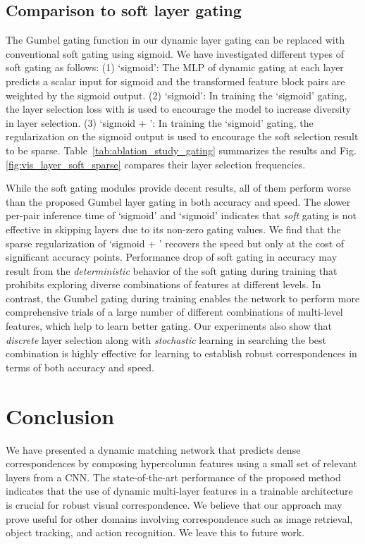 \documentclass[runningheads]{llncs}
\begin{document}
\subsection{Comparison to soft layer gating} \label{sec:softgating}
The Gumbel gating function in our dynamic layer gating can be replaced with conventional soft gating using sigmoid.  
We have investigated different types of soft gating as follows:   
(1) `sigmoid': The MLP of dynamic gating at each layer predicts a scalar input for sigmoid and the transformed feature block pairs are weighted by the sigmoid output.
(2) `sigmoid': In training the `sigmoid' gating, the layer selection loss  with  is used to encourage the model to increase diversity in layer selection.
(3) `sigmoid + ': In training the `sigmoid' gating, the  regularization on the sigmoid output is used to encourage the soft selection result to be sparse. 
Table~\ref{tab:ablation_study_gating} summarizes the results and Fig. \ref{fig:vis_layer_soft_sparse} compares their layer selection frequencies.  

While the soft gating modules provide decent results, all of them perform worse than the proposed Gumbel layer gating in both accuracy and speed. 
The slower per-pair inference time of `sigmoid' and `sigmoid' indicates that {\em soft} gating is not effective in skipping layers due to its non-zero gating values. We find that the sparse regularization of `sigmoid + ' recovers the speed but only at the cost of significant accuracy points.  
Performance drop of soft gating in accuracy may result from the {\em deterministic} behavior of the soft gating during training that prohibits exploring diverse combinations of features at different levels. 
In contrast, the Gumbel gating during training enables the network to perform more comprehensive trials of a large number of different combinations of multi-level features, which help to learn better gating.
Our experiments also show that {\em discrete} layer selection along with {\em stochastic} learning in searching the best combination is highly effective for learning to establish robust correspondences in terms of both accuracy and speed.
 

\section{Conclusion}
We have presented a dynamic matching network that predicts dense correspondences by composing hypercolumn features using a small set of relevant layers from a CNN. 
The state-of-the-art performance of the proposed method indicates that the use of dynamic multi-layer features in a trainable architecture is crucial for robust visual correspondence. 
We believe that our approach may prove useful for other domains involving correspondence such as image retrieval, object tracking, and action recognition.
We leave this to future work.
 
\end{document}

